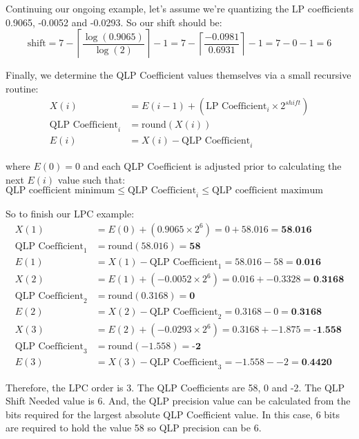 Continuing our ongoing example, let's assume we're quantizing the LP
coefficients 0.9065, -0.0052 and -0.0293.  So our shift should be:
\begin{equation}
\text{shift} = 7 - \left \lceil \frac{\log(0.9065)}{\log(2)} \right \rceil - 1
= 7 - \left \lceil \frac{-0.0981}{0.6931} \right \rceil - 1 = 7 - 0 - 1 = 6
\end{equation}
\par
\noindent
Finally, we determine the QLP Coefficient values themselves via a small
recursive routine:
\begin{align}
X(i) &= E(i - 1) + (\text{LP Coefficient}_i \times 2 ^ {shift}) \\
\text{QLP Coefficient}_i &= \text{round}(X(i)) \\
E(i) &= X(i) - \text{QLP Coefficient}_i
\end{align}
\par
\noindent
where $E(0) = 0$ and each QLP Coefficient is adjusted
prior to calculating the next $E(i)$ value such that:
$\text{QLP coefficient minimum} \leq \text{QLP Coefficient}_i \leq \text{QLP coefficient maximum}$

\pagebreak

So to finish our LPC example:
\begin{align}
X(1) &= E(0) + (0.9065 \times 2 ^ 6 ) = 0 + 58.016 = \textbf{58.016} \\
\text{QLP Coefficient}_1 &= \text{round}(58.016) = \textbf{58} \\
E(1) &= X(1) - \text{QLP Coefficient}_1 = 58.016 - 58 = \textbf{0.016} \\
X(2) &= E(1) + (-0.0052 \times 2 ^ 6 ) = 0.016 + -0.3328 = \textbf{0.3168} \\
\text{QLP Coefficient}_2 &= \text{round}(0.3168) = \textbf{0} \\
E(2) &= X(2) - \text{QLP Coefficient}_2 = 0.3168 - 0 = \textbf{0.3168} \\
X(3) &= E(2) + (-0.0293 \times 2 ^ 6 ) = 0.3168 + -1.875 = \textbf{-1.558} \\
\text{QLP Coefficient}_3 &= \text{round}(-1.558) = \textbf{-2} \\
E(3) &= X(3) - \text{QLP Coefficient}_3 = -1.558 - -2 = \textbf{0.4420}
\end{align}
\par
\noindent
Therefore, the LPC order is 3.
The QLP Coefficients are 58, 0 and -2.
The QLP Shift Needed value is 6.
And, the QLP precision value can be calculated from the bits required
for the largest absolute QLP Coefficient value.
In this case, 6 bits are required to hold the value 58 so
QLP precision can be 6.

